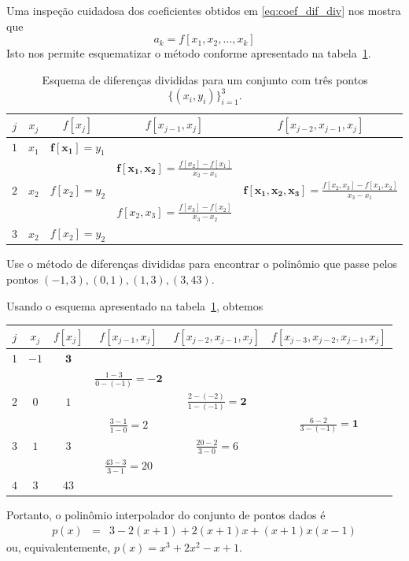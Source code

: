 Uma inspeção cuidadosa dos coeficientes obtidos em \eqref{eq:coef_dif_div} nos mostra que
\begin{equation*}
 a_k=f[x_1,x_2,\ldots,x_k] 
\end{equation*}
Isto nos permite esquematizar o método conforme apresentado na tabela~\ref{tab:esquema_difdiv}. 

\begin{table}
  \centering
  \caption{Esquema de diferenças divididas para um conjunto com três pontos $\{(x_i, y_i)\}_{i=1}^3$.}
  \label{tab:esquema_difdiv}
\begin{tabular}{c||c|ccc}\hline
$j$ & $x_j$ & $f[x_j]$ & $f[x_{j-1},x_j]$ & $f[x_{j-2},x_{j-1},x_j]$ \\\hline
$1$ & $x_1$ & $\pmb{f[x_1]}=y_1$ & &\\
&&&$\displaystyle \pmb{f[x_1,x_2]}=\frac{f[x_2]-f[x_1]}{x_2-x_1}$&\\
$2$ & $x_2$ & $f[x_2] = y_2$ && $\displaystyle \pmb{f[x_1,x_2,x_3]}=\frac{f[x_2,x_3]-f[x_1,x_2]}{x_3-x_1}$\\
&&&$\displaystyle f[x_2,x_3]=\frac{f[x_3]-f[x_2]}{x_3-x_2}$ &\\
$3$ & $x_2$ & $f[x_2]=y_2$ &&\\\hline
\end{tabular}
\end{table}

\begin{ex}
Use o método de diferenças divididas para encontrar o polinômio que passe pelos pontos $(-1,3),(0,1),(1,3),(3,43)$.
\end{ex}
\begin{sol}
Usando o esquema apresentado na tabela~\ref{tab:esquema_difdiv}, obtemos
\begin{center}
\begin{tabular}{c||c|cccc}\hline
 $j$ & $x_j$ & $f[x_j]$ & $f[x_{j-1},x_j]$ & $f[x_{j-2},x_{j-1},x_j]$ & $f[x_{j-3},x_{j-2},x_{j-1},x_j]$\\\hline
$1$ & $-1$ & $\pmb{3}$&&&\\
&&&$\displaystyle \frac{1-3}{0-(-1)}=\pmb{-2}$&&\\
$2$&$0$&$1$&&$\displaystyle \frac{2-(-2)}{1-(-1)}=\pmb{2}$&\\
&&&$\displaystyle \frac{3-1}{1-0}=2$&&$\displaystyle\frac{6-2}{3-(-1)}=\pmb{1}$\\
$3$&$1$&$3$&&$\displaystyle \frac{20-2}{3-0}=6$&\\
&&&$\displaystyle \frac{43-3}{3-1}=20$&&\\
$4$&$3$&$43$&&&\\\hline
\end{tabular}  
\end{center}
Portanto, o polinômio interpolador do conjunto de pontos dados é
\begin{eqnarray*}
p(x)&=&3-2(x+1)+2(x+1)x+(x+1)x(x-1)
\end{eqnarray*}
ou, equivalentemente, $p(x) = x^3+2x^2-x+1$.
\end{sol}

